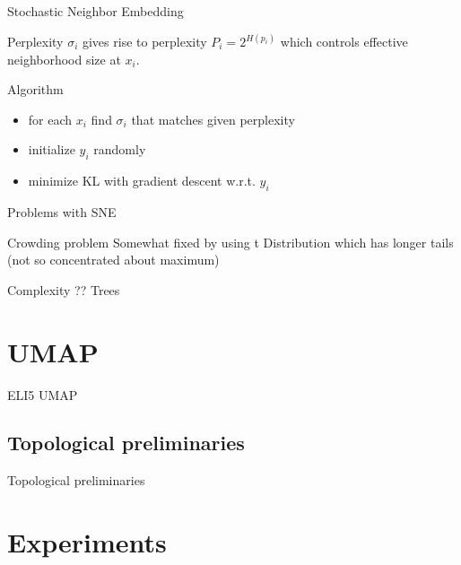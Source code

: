 \documentclass[unknownkeysallowed]{beamer}
\begin{document}
\begin{frame}{Stochastic Neighbor Embedding}

\begin{block}{Perplexity}
$\sigma_i$ gives rise to perplexity $P_i = 2^{H(p_i)}$ which controls effective neighborhood size at $x_i$.
\end{block}

\begin{block}{Algorithm}
\begin{itemize}
	\item for each $x_i$ find $\sigma_i$ that matches given perplexity
    \item initialize $y_i$ randomly
    \item minimize KL with gradient descent w.r.t. $y_i$
\end{itemize}
\end{block}

\end{frame}


\begin{frame}{Problems with SNE}

\begin{block}{Crowding problem}
Somewhat fixed by using t Distribution which has longer tails (not so concentrated about maximum)
\end{block}

\begin{block}{Complexity}
?? Trees
\end{block}

\end{frame}

\section{UMAP}


\begin{frame}{ELI5 UMAP}

\end{frame}

\subsection{Topological preliminaries}


\begin{frame}{Topological preliminaries}

\end{frame}

\section{Experiments}
\end{document}
